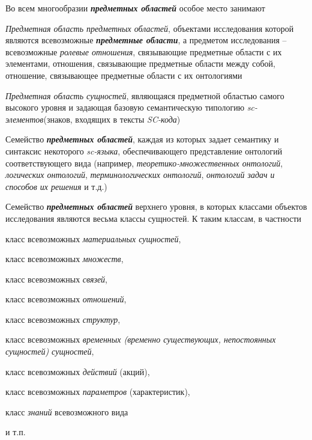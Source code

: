 \begin{SCn}
{Во всем многообразии \textbf{\textit{предметных областей}} особое место занимают
\begin{scnitemize}
    \item \textit{Предметная область предметных областей}, объектами исследования которой являются всевозможные \textbf{\textit{предметные области}}, а предметом исследования -- всевозможные \textit{ролевые отношения}, связывающие предметные области с их элементами, отношения, связывающие предметные области между собой, отношение, связывающее предметные области с их онтологиями
    \item \textit{Предметная область сущностей}, являющаяся предметной областью самого высокого уровня и задающая базовую семантическую типологию \textit{sc-элементов}(знаков, входящих в тексты \textit{SC-кода})
    \item Семейство \textbf{\textit{предметных областей}}, каждая из которых задает семантику и синтаксис некоторого \textit{sc-языка}, обеспечивающего представление онтологий соответствующего вида (например, \textit{теоретико-множественных онтологий}, \textit{логических онтологий}, \textit{терминологических онтологий}, \textit{онтологий задач и способов их решения} и т.д.)
    \item Семейство \textbf{\textit{предметных областей}} верхнего уровня, в которых классами объектов исследования являются весьма  классы сущностей. К таким классам, в частности
    
    \begin{scnitemizeii}
        \item класс всевозможных \textit{материальных сущностей},
        \item класс всевозможных \textit{множеств},
        \item класс всевозможных \textit{связей},
        \item класс всевозможных \textit{отношений},
        \item класс всевозможных \textit{структур},
        \item класс всевозможных \textit{временных (временно существующих, непостоянных сущностей) сущностей},
        \item класс всевозможных \textit{действий} (акций),
        \item класс всевозможных \textit{параметров} (характеристик),
        \item класс \textit{знаний} всевозможного вида 
        \item и т.п.
    \end{scnitemizeii}
\end{scnitemize}


}
\end{SCn}
